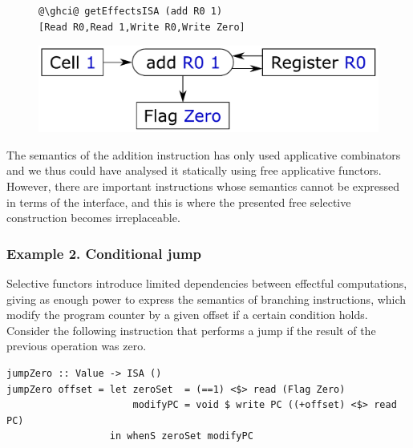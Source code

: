 \vspace{-1mm}
\begin{figure}[!h]
\begin{minipage}{0.53\textwidth}
\raggedleft
\begin{verbatim}
@\ghci@ getEffectsISA (add R0 1)
[Read R0,Read 1,Write R0,Write Zero]
\end{verbatim}
 \end{minipage}
 \begin{minipage}{0.44\textwidth}
  \centering
  \includegraphics[scale=0.3]{fig/add.pdf}
 \end{minipage}
\end{figure}
\vspace{-1mm}

\noindent
The semantics of the addition instruction has only used applicative combinators
and we thus could have analysed it statically using free applicative functors.
However, there are important instructions whose semantics cannot be expressed
in terms of the  interface, and this is where the presented
free selective construction becomes irreplaceable.

\subsubsection{Example 2. Conditional jump}

Selective functors introduce limited dependencies between effectful
computations, giving as enough power to express the semantics of branching
instructions, which modify the program counter by a given offset if a certain
condition holds. Consider the following instruction that performs a jump if the
result of the previous operation was zero.

\vspace{1mm}
\begin{verbatim}
jumpZero :: Value -> ISA ()
jumpZero offset = let zeroSet  = (==1) <$> read (Flag Zero)
                      modifyPC = void $ write PC ((+offset) <$> read PC)
                  in whenS zeroSet modifyPC
\end{verbatim}
\vspace{1mm}

